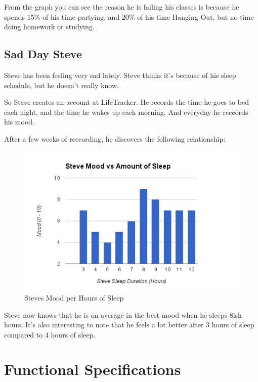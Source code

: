 \documentclass[12pt]{article}
\begin{document}
From the graph you can see the reason he is failing his classes is because he spends 15\% of his time partying, and 20\% of his time Hanging Out, but no time doing homework or studying.

\subsection{Sad Day Steve}

Steve has been feeling very sad lately. Steve thinks it's because of his sleep schedule, but he doesn't really know.

So Steve creates an account at LifeTracker. He records the time he goes to bed each night, and the time he wakes up each morning. And everyday he reccords his mood.

After a few weeks of reccording, he discovers the following relationship:

\begin{figure}[h!]
  \centering
  \includegraphics[scale=.9]{images/steveChart}
  \caption{Steves Mood per Hours of Sleep}
  \label{fig:steveChart}
\end{figure}

Steve now knows that he is on average in the best mood when he sleeps 8ish hours. It's also interesting to note that he feels a lot better after 3 hours of sleep compared to 4 hours of sleep.

\section{Functional Specifications}
\end{document}
